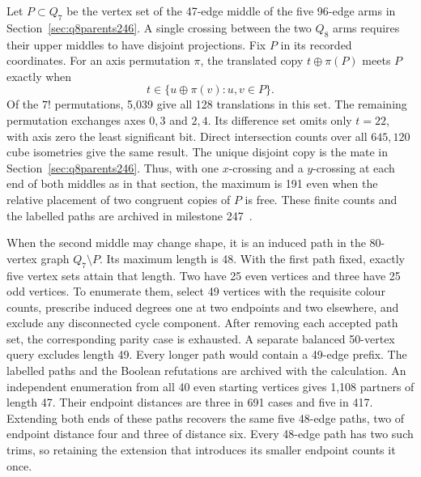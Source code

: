 \documentclass[11pt,a4paper]{article}
\theoremstyle{definition}
\theoremstyle{remark}
\begin{document}
Let \(P\subset Q_7\) be the vertex set of the 47-edge middle of the five
96-edge arms in Section~\ref{sec:q8parents246}. A single crossing between
the two \(Q_8\) arms requires their upper middles to have disjoint
projections. Fix \(P\) in its recorded coordinates. For an axis permutation
\(\pi\), the translated copy \(t\oplus\pi(P)\) meets \(P\) exactly when
\[
 t\in\{u\oplus\pi(v):u,v\in P\}.
\]
Of the \(7!\) permutations, 5,039 give all 128 translations in this
set. The remaining permutation exchanges axes \(0,3\) and \(2,4\).
Its difference set omits only \(t=22\), with axis zero the least
significant bit. Direct intersection counts over all \(645{,}120\) cube
isometries give the same result. The unique disjoint copy is the mate in
Section~\ref{sec:q8parents246}. Thus, with one \(x\)-crossing and a
\(y\)-crossing at each end of both middles as in that section, the
maximum is 191 even when the relative placement of two congruent copies
of \(P\) is free. These finite counts and the labelled paths are
archived in milestone 247~\cite{middle247}.

When the second middle may change shape, it is an induced path in the
80-vertex graph \(Q_7\setminus P\). Its maximum length is 48. With the
first path fixed, exactly five vertex sets attain that length. Two have
25 even vertices and three have 25 odd vertices. To enumerate them, select
49 vertices with the requisite colour counts, prescribe induced degrees
one at two endpoints and two elsewhere, and exclude any disconnected
cycle component. After removing each accepted path set, the corresponding
parity case is exhausted. A separate balanced 50-vertex query excludes
length 49. Every longer path would contain a 49-edge prefix. The labelled
paths and the Boolean refutations are archived with the calculation.
An independent enumeration from all 40 even starting vertices gives
1,108 partners of length 47. Their endpoint distances are three in 691
cases and five in 417. Extending both ends of these paths recovers the same
five 48-edge paths, two of endpoint distance four and three of distance six.
Every 48-edge path has two such trims, so retaining the extension that
introduces its smaller endpoint counts it once.
\end{document}
